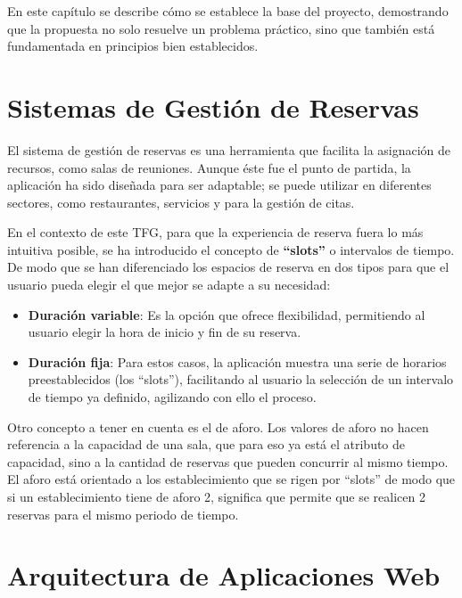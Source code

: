 
En este capítulo se describe cómo se establece la base del proyecto, demostrando que la propuesta no solo resuelve un problema práctico, sino que también está fundamentada en principios bien establecidos.

\section{Sistemas de Gestión de Reservas}

El sistema de gestión de reservas es una herramienta que facilita la asignación de recursos, como salas de reuniones. Aunque éste fue el punto de partida, la aplicación ha sido diseñada para ser adaptable; se puede utilizar en diferentes sectores, como restaurantes, servicios y para la gestión de citas.

En el contexto de este TFG, para que la experiencia de reserva fuera lo más intuitiva posible, se ha introducido el concepto de \textbf{``slots''} o intervalos de tiempo. De modo que se han diferenciado los espacios de reserva en dos tipos para que el usuario pueda elegir el que mejor se adapte a su necesidad:
\begin{itemize}
\tightlist
   \item \textbf{Duración variable}: Es la opción que ofrece flexibilidad, permitiendo al usuario elegir la hora de inicio y fin de su reserva.
   \item \textbf{Duración fija}: Para estos casos, la aplicación muestra una serie de horarios preestablecidos (los ``slots''), facilitando al usuario la selección de un intervalo de tiempo ya definido, agilizando con ello el proceso.
\end{itemize}

Otro concepto a tener en cuenta es el de aforo. Los valores de aforo no hacen referencia a la capacidad de una sala, que para eso ya está el atributo de capacidad, sino a la cantidad de reservas que pueden concurrir al mismo tiempo. El aforo está orientado a los establecimiento que se rigen por ``slots'' de modo que si un establecimiento tiene de aforo 2, significa que permite que se realicen 2 reservas para el mismo periodo de tiempo.

\section{Arquitectura de Aplicaciones Web}

